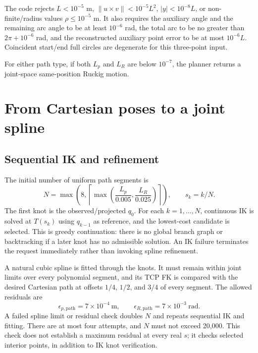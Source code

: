 \documentclass[11pt,a4paper]{report}
\newcommand{\norm}[1]{\left\lVert#1\right\rVert}
\begin{document}
The code rejects $L<10^{-5}$ m, $\norm{u\times v}<10^{-5}L^2$,
$|y|<10^{-8}L$, or non-finite/radius values $\rho\le10^{-5}$ m.
It also requires the auxiliary angle and the remaining arc angle to be at
least $10^{-6}$ rad, the total arc to be no greater than $2\pi+10^{-6}$ rad,
and the reconstructed auxiliary point error to be at most $10^{-6}L$.
Coincident start/end full circles are degenerate for this three-point input.

For either path type, if both $L_p$ and $L_R$ are below $10^{-7}$, the planner
returns a joint-space same-position Ruckig motion.

\section{From Cartesian poses to a joint spline}
\subsection{Sequential IK and refinement}
The initial number of uniform path segments is
\begin{equation}
 N=\max\left(8,\left\lceil\max\left(\frac{L_p}{0.005},
 \frac{L_R}{0.025}\right)\right\rceil\right),\qquad s_k=k/N.
\end{equation}
The first knot is the observed/projected $q_0$. For each $k=1,\ldots,N$,
continuous IK is solved at $T(s_k)$ using $q_{k-1}$ as reference, and the
lowest-cost candidate is selected. This is greedy continuation: there is no
global branch graph or backtracking if a later knot has no admissible solution.
An IK failure terminates the request immediately rather than invoking spline
refinement.

A natural cubic spline is fitted through the knots. It must remain within
joint limits over every polynomial segment, and its TCP FK is compared with
the desired Cartesian path at offsets $1/4$, $1/2$, and $3/4$ of every segment.
The allowed residuals are
\begin{equation}
 \epsilon_{p,\mathrm{path}}=7\times10^{-4}\ \mathrm{m},\qquad
 \epsilon_{R,\mathrm{path}}=7\times10^{-3}\ \mathrm{rad}.
\end{equation}
A failed spline limit or residual check doubles $N$ and repeats sequential
IK and fitting. There are at most four attempts, and $N$ must not exceed
20,000. This check does not establish a maximum residual at every real $s$;
it checks selected interior points, in addition to IK knot verification.
\end{document}
